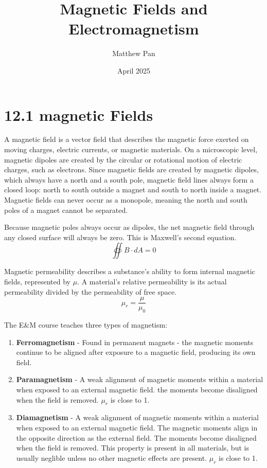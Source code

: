 \documentclass[12pt, titlepage]{article}
\title{Magnetic Fields and Electromagnetism}
\author{Matthew Pan}
\date{April 2025}
\begin{document}
\pagestyle{fancy}

\fancyhead{}
\fancyhead[R]{\thepage}

\maketitle

\section*{12.1 magnetic Fields}

A magnetic field is a vector field that describes the magnetic force exerted on moving charges, electric currents, or magnetic materials. On a microscopic level, magnetic dipoles are created by the circular or rotational motion of electric charges, such as electrons. Since magnetic fields are created by magnetic dipoles, which always have a north and a south pole, magnetic field lines always form a closed loop: north to south outside a magnet and south to north inside a magnet. Magnetic fields can never occur as a monopole, meaning the north and south poles of a magnet cannot be separated.

Because magnetic poles always occur as dipoles, the net magnetic field through any closed surface will always be zero. This is Maxwell's second equation.
\begin{equation*}
    \oiint B \cdot dA = 0
\end{equation*}

Magnetic permeability describes a substance's ability to form internal magnetic fields, represented by $\mu$. A material's relative permeability is its actual permeability divided by the permeability of free space.
\begin{equation*}
    \mu_r = \frac{\mu}{\mu_0}
\end{equation*}

The E\&M course teaches three types of magnetism:
\begin{enumerate}
    \item \textbf{Ferromagnetism} - Found in permanent magnets - the magnetic moments continue to be aligned after exposure to a magnetic field, producing its own field. 
    \item \textbf{Paramagnetism} - A weak alignment of magnetic moments within a material when exposed to an external magnetic field. the moments become disaligned when the field is removed. $\mu_r$ is close to 1.
    \item \textbf{Diamagnetism} - A weak alignment of magnetic moments within a material when exposed to an external magnetic field. The magnetic moments align in the opposite direction as the external field. The moments become disaligned when the field is removed. This property is present in all materials, but is usually neglible unless no other magnetic effects are present. $\mu_r$ is close to 1.
\end{enumerate}
\end{document}
